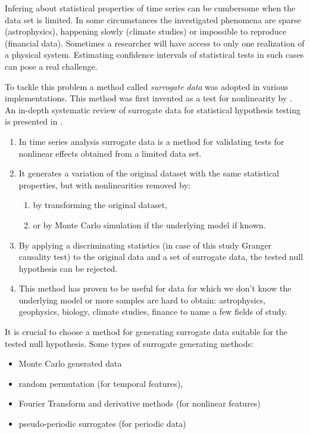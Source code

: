Infering about statistical properties of time series can be cumbersome when the data set is limited.
In some circumstances the investigated phenomena are sparse (astrophysics), happening slowly (climate studies) or impossible to reproduce (financial data).
Sometimes a researcher will have access to only one realization of a physical system.
Estimating confidence intervals of statistical tests in such cases can pose a real challenge.

To tackle this problem a method called \emph{surrogate data} was adopted in various implementations.
This method was first invented as a test for nonlinearity by \cite{1992-thelier}.
An in-depth systematic review of surrogate data for statistical hypothesis testing is presented in \cite{2018-lancaster}.


\begin{enumerate}
\item In time series analysis surrogate data is a method for validating tests for nonlinear effects obtained from a limited data set.
\item It generates a variation of the original dataset with the same statistical properties, but with nonlinearities removed by:
    \begin{enumerate}
    \item by transforming the original dataset,
    \item or by Monte Carlo simulation if the underlying model if known.
    \end{enumerate}
\item By applying a discriminating statistics (in case of this study Granger causality test) to the original data and a set of surrogate data,
    the tested null hypothesis can be rejected.
\item This method has proven to be useful for data for which we don't know the underlying model or more samples are hard to obtain:
    astrophysics, geophysics, biology, climate studies, finance to name a few fields of study.
\end{enumerate}

It is crucial to choose a method for generating surrogate data suitable for the tested null hypothesis.
Some types of surrogate generating methods:
\begin{itemize}
    \item Monte Carlo generated data
    \item random permutation (for temporal features),
    \item Fourier Transform and derivative methods (for nonlinear features)
    \item pseudo-periodic surrogates (for periodic data)
\end{itemize}

